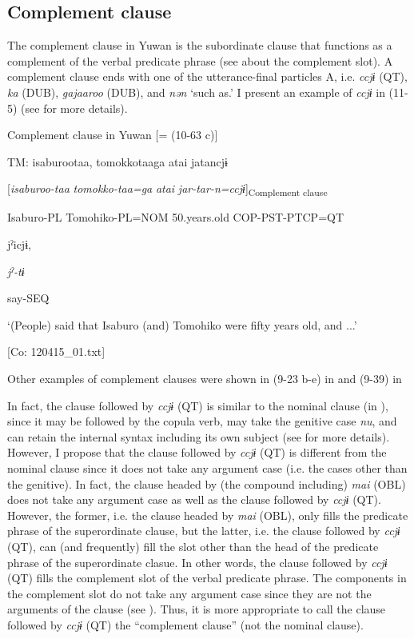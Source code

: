 \subsection{Complement clause}\label{sec:11.1.4}

The complement clause in Yuwan is the subordinate clause that functions as a complement of the verbal predicate phrase (see  about the complement slot). A complement clause ends with one of the utterance-final particles A, i.e. \textit{ccjɨ} (QT), \textit{ka} (DUB), \textit{gajaaroo} (DUB), and \textit{nən} ‘such as.’ I present an example of \textit{ccjɨ} in (11-5) (see  for more details).

\ea\label{ex:11-5}  Complement clause in Yuwan [= (10-63 c)]

  TM:  isaburootaa,  tomokkotaaga  atai  jatancjɨ

    [\textit{isaburoo-taa}  \textit{tomokko-taa=ga}  \textit{atai}  \textit{jar-tar-n=ccjɨ}]\textsubscript{Complement clause}

    Isaburo-PL  Tomohiko-PL=NOM  50.years.old  COP-PST-PTCP=QT

    jˀicjɨ,

    \textit{jˀ{}-tɨ}

    say-SEQ

    ‘(People) said that Isaburo (and) Tomohiko were fifty years old, and ...’

    [Co: 120415\_01.txt]
\z

Other examples of complement clauses were shown in (9-23 b-e) in  and (9-39) in 

In fact, the clause followed by \textit{ccjɨ} (QT) is similar to the nominal clause (in ), since it may be followed by the copula verb, may take the genitive case \textit{nu}, and can retain the internal syntax including its own subject (see  for more details). However, I propose that the clause followed by \textit{ccjɨ} (QT) is different from the nominal clause since it does not take any argument case (i.e. the cases other than the genitive). In fact, the clause headed by (the compound including) \textit{mai} (OBL) does not take any argument case as well as the clause followed by \textit{ccjɨ} (QT). However, the former, i.e. the clause headed by \textit{mai} (OBL), only fills the predicate phrase of the superordinate clause, but the latter, i.e. the clause followed by \textit{ccjɨ} (QT), can (and frequently) fill the slot other than the head of the predicate phrase of the superordinate clasue. In other words, the clause followed by \textit{ccjɨ} (QT) fills the complement slot of the verbal predicate phrase. The components in the complement slot do not take any argument case since they are not the arguments of the clause (see ). Thus, it is more appropriate to call the clause followed by \textit{ccjɨ} (QT) the “complement clause” (not the nominal clause).


